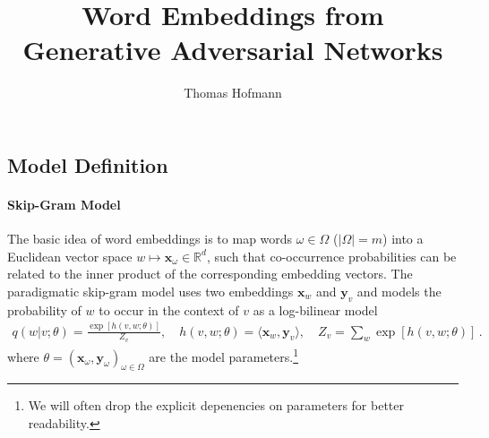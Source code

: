 \documentclass{article}
\title{
	Word Embeddings from\\
	Generative Adversarial Networks
}
\author{Thomas Hofmann}
\renewcommand{\Re}{{\mathbb R}}
\newcommand{\x}{{\mathbf x}}
\newcommand{\y}{{\mathbf y}}
\begin{document}
\maketitle 

\subsection*{Model Definition}

\paragraph{Skip-Gram Model} The basic idea of word embeddings is to map words $\omega \in \Omega$ ($|\Omega|=m$) into a Euclidean vector space $w \mapsto \x_\omega \in \Re^d$, such that co-occurrence probabilities can be related to the inner product of the corresponding embedding vectors. The paradigmatic skip-gram model \cite{mikolov2013distributed} uses two embeddings $\x_w$ and $\y_v$ and models the probability of $w$ to occur in the context of $v$ as a log-bilinear model
\begin{align}
q(w | v; \theta) = \frac{\exp[h(v,w; \theta)]}{Z_v}, \quad 
h(v,w; \theta) = \langle \x_w, \y_v \rangle, \quad 
Z_v = \sum_{w} \exp[h(v,w; \theta)]\,.
\label{eq:bilinear}
\end{align}
where $\theta = (\x_\omega, \y_\omega)_{\omega \in \Omega}$ are the model parameters.\footnote{We will often drop the explicit depenencies on parameters for better readability.}
\end{document}
